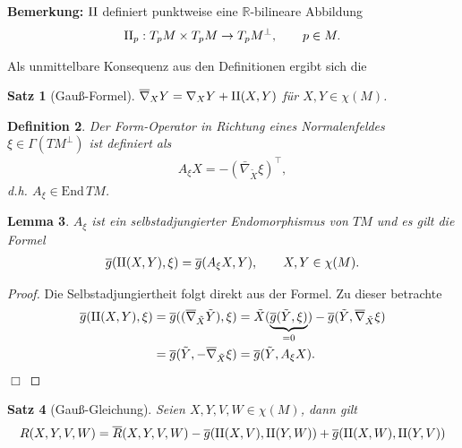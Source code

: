 \documentclass[12pt,a4paper]{article}
\def\R{\mathbb{R}}
\def\End{\mathrm{End}\,}
\newtheorem{Lemma}{Lemma}[section]
\newtheorem{Satz}[Lemma]{Satz}
\newtheorem{Definition}[Lemma]{Definition}
\def\qed{\quad\hfill\ensuremath{\Box}}
\begin{document}
\bigskip

{\bf Bemerkung:}
$\mathrm{II}$ definiert punktweise eine $\R$-bilineare Abbildung
\begin{align*}
\mathrm{II}_p : T_pM\times T_p M \to T_pM^\bot,\qquad p\in M.
\end{align*}

\bigskip

Als unmittelbare Konsequenz aus den Definitionen ergibt sich die

\begin{Satz}[Gau\ss{}-Formel]
$\overline{\nabla}_X Y = \nabla_X Y + \mathrm{II}(X,Y)$ f\"ur $X,Y\in\chi(M)$.
\end{Satz}

\bigskip

\begin{Definition}
Der \emph{Form-Operator} in Richtung eines Normalenfeldes $\xi\in
\Gamma(TM^\bot)$ ist definiert als
\begin{align*}
A_\xi X = -(\bar{\nabla}_{\tilde{X}}\xi)^\top, 
\end{align*}
d.h. $A_\xi\in \End TM$.
\end{Definition}

\bigskip

\begin{Lemma}
$A_\xi$ ist ein selbstadjungierter Endomorphismus von $TM$ und es gilt die
Formel
\begin{align*}
\overline{g}(\mathrm{II}(X,Y),\xi) = \overline{g}(A_\xi X, Y), \qquad X,Y\in\chi(M).
\end{align*}
\end{Lemma}

\medskip

\begin{proof}
Die Selbstadjungiertheit folgt direkt aus der Formel. Zu dieser betrachte
\begin{align*}
\overline{g}(\mathrm{II}(X,Y),\xi) &= \overline{g}( (\overline{\nabla}_{\tilde{X}}\tilde{Y}),\xi )
= \tilde{X}(\underbrace{\overline{g}(\tilde{Y},\xi)}_{=0}) -
\overline{g}(\tilde{Y},\overline{\nabla}_{\tilde{X}}\xi)\\
&= \overline{g}(\tilde{Y},-\overline{\nabla}_{\tilde{X}}\xi)
= \overline{g}(\tilde{Y},A_\xi X).
\end{align*}
\qed
\end{proof}

\bigskip

\begin{Satz}[Gau\ss{}-Gleichung]
Seien $X,Y,V,W\in\chi(M)$, dann gilt
\begin{align*}
R(X,Y,V,W) = \overline{R}(X,Y,V,W) - \overline{g}(\mathrm{II}(X,V),\mathrm{II}(Y,W))
+ \overline{g}(\mathrm{II}(X,W),\mathrm{II}(Y,V))
\end{align*}
\end{Satz}
\end{document}
